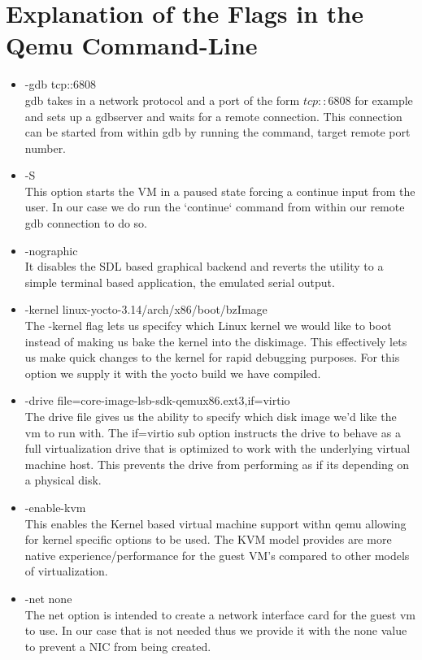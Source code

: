 \documentclass[letterpaper,10pt,draftclsnofoot,onecolumn]{IEEEtran}
\begin{document}
\section{Explanation of the Flags in the Qemu Command-Line}
\begin{itemize}
\item -gdb tcp::6808\\
gdb takes in a network protocol and a port of the form $tcp::6808$ for example and sets up a gdbserver and waits for a remote connection. This connection can be started from within gdb by running the command, target remote port number.
\item -S\\
This option starts the VM in a paused state forcing a continue input from the user. In our case we do run the `continue` command from within our remote gdb connection to do so.
\item -nographic\\
It disables the SDL based graphical backend and reverts the utility to a simple terminal based application, the emulated serial output.
\item -kernel linux-yocto-3.14/arch/x86/boot/bzImage\\
The -kernel flag lets us specifcy which Linux kernel we would like to boot instead of making us bake the kernel into the diskimage. This effectively lets us make quick changes to the kernel for rapid debugging purposes. For this option we supply it with the yocto build we have compiled.
\item -drive file=core-image-lsb-sdk-qemux86.ext3,if=virtio\\
The drive file gives us the ability to specify which disk image we'd like the vm to run with. The if=virtio sub option instructs the drive to behave as a full virtualization drive that is optimized to work with the underlying virtual machine host. This prevents the drive from performing as if its depending on a physical disk.
\item -enable-kvm\\
This enables the Kernel based virtual machine support withn qemu allowing for kernel specific options to be used. The KVM model provides are more native experience/performance for the guest VM's compared to other models of virtualization.
\item -net none\\
The net option is intended to create a network interface card for the guest vm to use. In our case that is not needed thus we provide it with the none value to prevent a NIC from being created.

\end{itemize}
\end{document}
